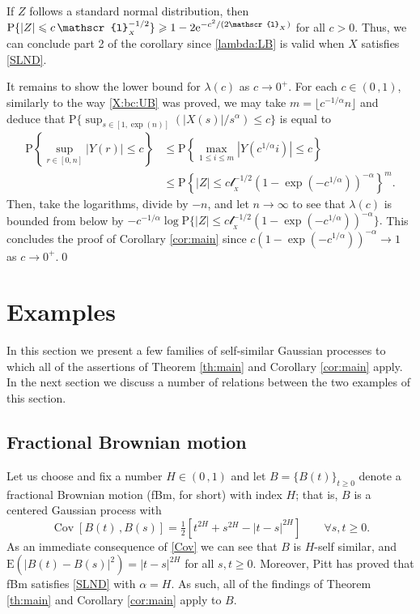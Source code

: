 \documentclass[reqno]{amsart}
\DeclareMathOperator{\Cov}{Cov}
\newcommand{\<}{\langle}
\renewcommand{\>}{\rangle}
\renewcommand{\P}{\mathrm{P}}
\newcommand{\E}{\mathrm{E}}
\newcommand{\1}{\mathbb{1}}
\newcommand{\e}{{\rm e}}
\renewcommand{\ge}{\geqslant}
\renewcommand{\le}{\leqslant}
\theoremstyle{definition}
\numberwithin{equation}{section}
\begin{document}
If $Z$ follows a standard normal distribution, then 
$\P\{\textstyle |Z| \le c\, \mathscr{l}_{_X}^{-1/2}\}\ge  1 - 2\e^{-c^2/(2\mathscr{l}_{_X})}$
for all $c>0.$ Thus, we can conclude part 2 of the corollary
since \eqref{lambda:LB} is valid when $X$ satisfies \eqref{SLND}.

It remains to show the lower bound for $\lambda(c)$ as $c\to0^+$. 
For each $c \in (0\,,1)$, similarly to the way \eqref{X:bc:UB} was proved, we may take $m = \lfloor c^{-1/\alpha}n \rfloor$ and deduce that $\P\{\sup_{s\in [1,\exp(n)]} ( |X(s)|/s^\alpha) \le c \}$
is equal to
\begin{align*}\textstyle
	\P\left\{ \sup_{r \in [0,n]} |Y(r)| \le c \right\}
	&\le \P\left\{ \max_{1\le i \le m} |Y(c^{1/\alpha} i)| \le c \right\}\\
	&\le \P\left\{ |Z| \le  c\mathscr{l}_{_X}^{-1/2} (1-\exp(-c^{1/\alpha}))^{-\alpha} \right\}^m.
\end{align*}
Then, take the logarithms, divide by $-n$, and let $n\to\infty$ to see that
$\lambda(c)$ is bounded from below by $-c^{-1/\alpha} \log \P \{ |Z| \le 
 c\mathscr{l}_{_X}^{-1/2} (1-\exp(-c^{1/\alpha}))^{-\alpha}  \}.$
This concludes the proof of Corollary \ref{cor:main} 
since $c(1-\exp(-c^{1/\alpha}))^{-\alpha} \to 1$ as $c \to 0^+$.\qed


\section{Examples}
In this section we present a few families of self-similar Gaussian processes
to which all of the assertions of Theorem \ref{th:main} and Corollary \ref{cor:main}
apply. In the next section we discuss a number of relations between the two examples
of this section.

\subsection{Fractional Brownian motion}
 
Let us choose and fix a number
$H\in(0\,,1)$ and let $B=\{B(t)\}_{t\ge0}$ denote a fractional Brownian motion 
(fBm, for short) with index
$H$; that is, $B$ is a centered Gaussian process with
\begin{equation}\label{Cov}
	\Cov[ B(t) \,, B(s)] = \tfrac12\left[ t^{2H} + s^{2H} - |t-s|^{2H}\right]\qquad\forall s,t\ge0.
\end{equation}
As an immediate consequence of \eqref{Cov} we can see that $B$ is $H$-self similar, 
and $\E(|B(t)-B(s)|^2) = |t-s|^{2H}$ for all $s,t\ge0$.
Moreover, Pitt \cite{Pitt78} has proved that fBm satisfies \eqref{SLND} with $\alpha=H$.
As such, all of the findings
of Theorem \ref{th:main} and Corollary \ref{cor:main} apply to $B$.
\end{document}
